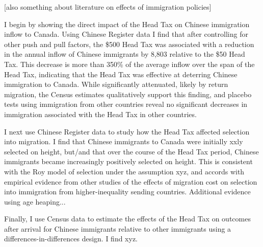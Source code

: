 [also something about literature on effects of immigration policies]

I begin by showing the direct impact of the Head Tax on Chinese immigration inflow to Canada. Using Chinese Register data I find that after controlling for other push and pull factors, the \$500 Head Tax was associated with a reduction in the annual inflow of Chinese immigrants by 8,803 relative to the \$50 Head Tax. This decrease is more than 350\% of the average inflow over the span of the Head Tax, indicating that the Head Tax was effective at deterring Chinese immigration to Canada. While significantly attenuated, likely by return migration, the Census estimates qualitatively support this finding, and placebo tests using immigration from other countries reveal no significant decreases in immigration associated with the Head Tax in other countries.

I next use Chinese Register data to study how the Head Tax affected selection into migration. I find that Chinese immigrants to Canada were initially xxly selected on height, but/and that over the course of the Head Tax period, Chinese immigrants became increasingly positively selected on height. This is consistent with the Roy model of selection under the assumption xyz, and accords with empirical evidence from other studies of the effects of migration cost on selection into immigration from higher-inequality sending countries. Additional evidence using age heaping...

Finally, I use Census data to estimate the effects of the Head Tax on outcomes after arrival for Chinese immigrants relative to other immigrants using a differences-in-differences design. I find xyz. 









